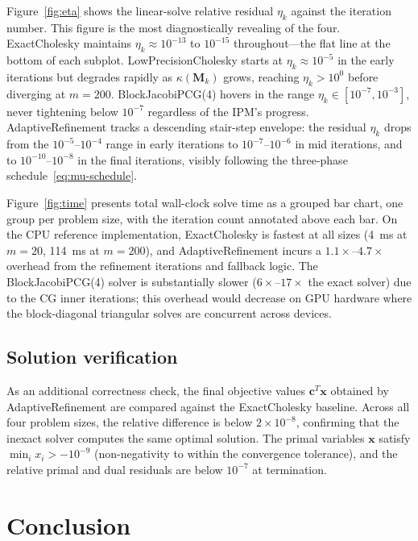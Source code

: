 \documentclass[11pt,twoside]{article}
\newcommand{\bc}{\mathbf{c}}
\newcommand{\bx}{\mathbf{x}}
\newcommand{\bM}{\mathbf{M}}
\begin{document}
Figure~\ref{fig:eta} shows the linear-solve relative residual $\eta_k$
against the iteration number.  This figure is the most diagnostically
revealing of the four.  ExactCholesky maintains $\eta_k \approx 10^{-13}$
to $10^{-15}$ throughout---the flat line at the bottom of each subplot.
LowPrecisionCholesky starts at $\eta_k \approx 10^{-5}$ in the early
iterations but degrades rapidly as $\kappa(\bM_k)$ grows, reaching
$\eta_k > 10^0$ before diverging at $m=200$.  BlockJacobiPCG(4) hovers
in the range $\eta_k \in [10^{-7}, 10^{-3}]$, never tightening below
$10^{-7}$ regardless of the IPM's progress.  AdaptiveRefinement tracks a
descending stair-step envelope: the residual $\eta_k$ drops from the
$10^{-5}$--$10^{-4}$ range in early iterations to $10^{-7}$--$10^{-6}$ in
mid iterations, and to $10^{-10}$--$10^{-8}$ in the final iterations,
visibly following the three-phase schedule~\eqref{eq:mu-schedule}.

Figure~\ref{fig:time} presents total wall-clock solve time as a grouped
bar chart, one group per problem size, with the iteration count annotated
above each bar.  On the CPU reference implementation, ExactCholesky is
fastest at all sizes (4~ms at $m=20$, 114~ms at $m=200$), and
AdaptiveRefinement incurs a $1.1\times$--$4.7\times$ overhead from the
refinement iterations and fallback logic.  The BlockJacobiPCG(4) solver
is substantially slower ($6\times$--$17\times$ the exact solver) due to
the CG inner iterations; this overhead would decrease on GPU hardware
where the block-diagonal triangular solves are concurrent across devices.

\subsection{Solution verification}

As an additional correctness check, the final objective values
$\bc^T\bx$ obtained by AdaptiveRefinement are compared against the
ExactCholesky baseline.  Across all four problem sizes, the relative
difference is below $2\times 10^{-8}$, confirming that the inexact
solver computes the same optimal solution.  The primal variables $\bx$
satisfy $\min_i x_i > -10^{-9}$ (non-negativity to within the
convergence tolerance), and the relative primal and dual residuals are
below $10^{-7}$ at termination.

\section{Conclusion}
\label{sec:conclusion}
\end{document}
